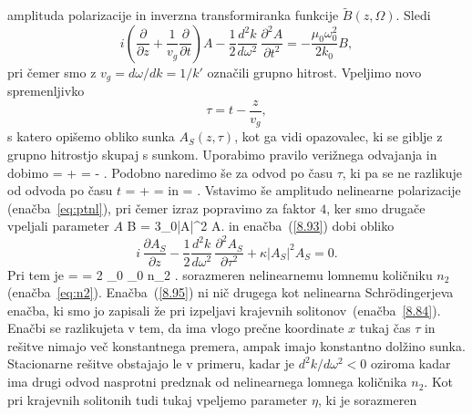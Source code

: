 amplituda polarizacije in inverzna transformiranka 
funkcije $\tilde{B}(z,\Omega)$.
Sledi
\begin{equation}
i (\frac{\partial}{\partial z}+\frac{1}{v_{g}}\frac{\partial}{\partial t})A-
\frac{1}{2}\frac{d^{2}k}{d\omega^{2}}\,\frac{\partial^{2}A}{\partial t^{2}}=
-\frac{\mu_0\omega_0^2}{2 k_0}B,
\label{8.93}
\end{equation}
pri čemer smo z $v_g = d\omega/dk = 1/k'$ označili grupno hitrost.
Vpeljimo novo spremenljivko 
\begin{equation}
\tau=t-\frac{z}{v_{g}},
\label{nelinver}
\end{equation}
s katero opišemo obliko sunka $A_S(z,\tau)$, kot ga vidi opazovalec, ki se giblje
z grupno hitrostjo skupaj s sunkom. Uporabimo pravilo verižnega odvajanja in dobimo
\beq
{} =  + 
=  - .
\eeq
Podobno naredimo še za odvod po času $\tau$, ki pa se ne razlikuje od odvoda po času $t$
\beq
{} = +
=  
\eeq
in
\beq
{} = .
\eeq
Vstavimo še amplitudo nelinearne polarizacije (enačba~\ref{eq:ptnl}), pri čemer izraz popravimo
za faktor $4$, ker smo drugače vpeljali parameter $A$
\beq
B = 3\varepsilon_0\chi |A|^2 A.
\eeq
in enačba~(\ref{8.93}) dobi obliko 
\begin{equation}
i\,\frac{\partial A_S}{\partial z}-\frac{1}{2}\frac{d^{2}k}{d\omega^{2}}\,\frac{\partial^{2}A_S}{\partial\tau^{2}}+\kappa\left|A_S\right|^{2}A_S=0.
\label{8.95}
\end{equation}
Pri tem je 
\beq
\kappa =  = 2 \omega_0 \varepsilon_0 n_2 .
\eeq
sorazmeren nelinearnemu lomnemu količniku $n_2$ 
(enačba~\ref{eq:n2}). Enačba~(\ref{8.95}) ni nič drugega kot nelinearna Schr\"odingerjeva 
enačba, ki smo jo 
zapisali že pri izpeljavi krajevnih solitonov~(enačba~\ref{8.84}). Enačbi se razlikujeta v tem, da
ima vlogo prečne koordinate $x$ tukaj čas $\tau$ in rešitve nimajo več konstantnega premera,
ampak imajo konstantno dolžino sunka. Stacionarne rešitve obstajajo le v primeru, kadar je  $d^{2}k/d\omega^{2}<0$ oziroma kadar ima drugi odvod nasprotni predznak od nelinearnega lomnega količnika $n_2$. Kot pri krajevnih solitonih tudi tukaj vpeljemo parameter $\eta$, ki je sorazmeren 
